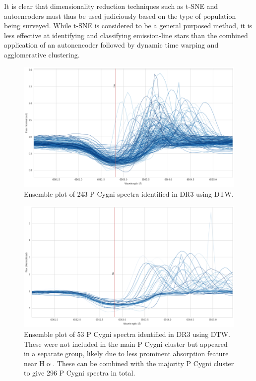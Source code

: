 It is clear that dimensionality reduction techniques such as t-SNE and autoencoders must thus be used judiciously based on the type of population being surveyed. While t-SNE is considered to be a general purposed method, it is less effective at identifying and classifying emission-line stars than the combined application of an autonencoder followed by dynamic time warping and agglomerative clustering. 

\begin{figure}[!htb]
\centering
\includegraphics[scale=0.45]{figures/p cygni ensemble.png}
\caption{Ensemble plot of 243 P Cygni spectra identified in DR3 using DTW.}
\end{figure}

\begin{figure}[!htb]
\centering
\includegraphics[scale=0.45]{figures/p cugni 2.png}
\caption{Ensemble plot of 53 P Cygni spectra identified in DR3 using DTW. These were not included in the main P Cygni cluster but appeared in a separate group, likely due to less prominent absorption feature near H$\upalpha$. These can be combined with the majority P Cygni cluster to give 296 P Cygni spectra in total.}
\end{figure}


